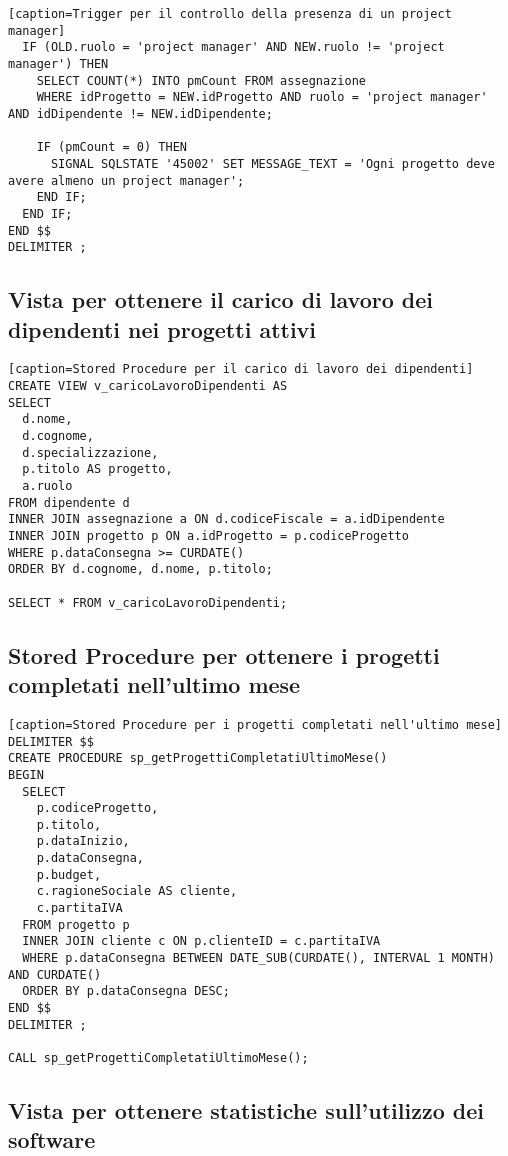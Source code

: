 \documentclass[a4paper,11pt]{article}
\begin{document}
{\begin{lstlisting}[style=SQL][caption=Trigger per il controllo della presenza di un project manager]
  IF (OLD.ruolo = 'project manager' AND NEW.ruolo != 'project manager') THEN
    SELECT COUNT(*) INTO pmCount FROM assegnazione 
    WHERE idProgetto = NEW.idProgetto AND ruolo = 'project manager' AND idDipendente != NEW.idDipendente;
    
    IF (pmCount = 0) THEN
      SIGNAL SQLSTATE '45002' SET MESSAGE_TEXT = 'Ogni progetto deve avere almeno un project manager';
    END IF;
  END IF;
END $$
DELIMITER ;
\end{lstlisting}
\newpage

\subsection{Vista per ottenere il carico di lavoro dei dipendenti nei progetti attivi}

\begin{lstlisting}[style=SQL][caption=Stored Procedure per il carico di lavoro dei dipendenti]
CREATE VIEW v_caricoLavoroDipendenti AS
SELECT 
  d.nome, 
  d.cognome, 
  d.specializzazione, 
  p.titolo AS progetto, 
  a.ruolo
FROM dipendente d
INNER JOIN assegnazione a ON d.codiceFiscale = a.idDipendente
INNER JOIN progetto p ON a.idProgetto = p.codiceProgetto
WHERE p.dataConsegna >= CURDATE()
ORDER BY d.cognome, d.nome, p.titolo;

SELECT * FROM v_caricoLavoroDipendenti;
\end{lstlisting}

\subsection{Stored Procedure per ottenere i progetti completati nell'ultimo mese}

\begin{lstlisting}[style=SQL][caption=Stored Procedure per i progetti completati nell'ultimo mese]
DELIMITER $$
CREATE PROCEDURE sp_getProgettiCompletatiUltimoMese()
BEGIN
  SELECT 
    p.codiceProgetto,
    p.titolo,
    p.dataInizio,
    p.dataConsegna,
    p.budget,
    c.ragioneSociale AS cliente,
    c.partitaIVA
  FROM progetto p
  INNER JOIN cliente c ON p.clienteID = c.partitaIVA
  WHERE p.dataConsegna BETWEEN DATE_SUB(CURDATE(), INTERVAL 1 MONTH) AND CURDATE()
  ORDER BY p.dataConsegna DESC;
END $$
DELIMITER ;

CALL sp_getProgettiCompletatiUltimoMese();
\end{lstlisting}

\newpage
\subsection{Vista per ottenere statistiche sull'utilizzo dei software}

}
\end{document}
